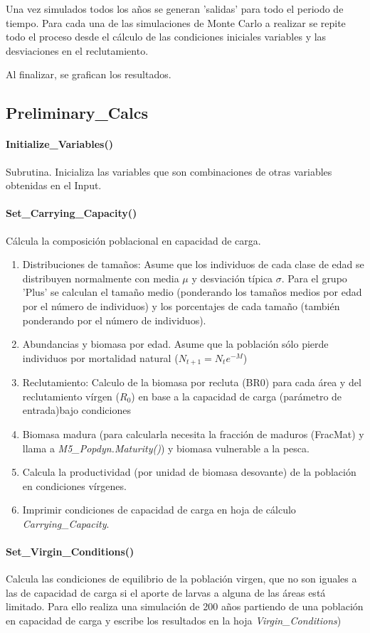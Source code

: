 \documentclass[12pt, oneside, a4paper]{article}
\begin{document}
		Una vez simulados todos los años se generan 'salidas' para todo el periodo de tiempo.
		Para cada una de las simulaciones de Monte Carlo a realizar se repite todo el proceso desde el cálculo de las condiciones iniciales variables y las desviaciones en el reclutamiento. 

		Al finalizar, se grafican los resultados.
		
		\subsection{Preliminary\_Calcs}
			\paragraph{Initialize\_Variables()}
				Subrutina. Inicializa las variables que son combinaciones de otras variables obtenidas en el Input. 
			\paragraph{Set\_Carrying\_Capacity()}
				Cálcula la composición poblacional en capacidad de carga. 
					\begin{enumerate}
						\item Distribuciones de tamaños: Asume que los individuos de cada clase de edad se distribuyen normalmente con media $\mu$ y desviación típica $\sigma$. Para el grupo 'Plus' se calculan el tamaño medio (ponderando los tamaños medios por edad por el número de individuos) y los porcentajes de cada tamaño (también ponderando por el número de individuos). 
						\item Abundancias y biomasa por edad. Asume que la población sólo pierde individuos por mortalidad natural ($N_{t+1}=N_t e^{-M}$)
						\item Reclutamiento: Calculo de la biomasa por recluta (BR0) para cada área y del reclutamiento vírgen ($R_0$) en base a la capacidad de carga (parámetro de entrada)bajo condiciones  
						\item Biomasa madura (para calcularla necesita la fracción de maduros (FracMat) y llama a \emph{M5\_Popdyn.Maturity()}) y biomasa vulnerable a la pesca. 
						\item Calcula la productividad (por unidad de biomasa desovante) de la población en condiciones vírgenes. 
						\item Imprimir condiciones de capacidad de carga en hoja de cálculo \emph{Carrying\_Capacity}. 
					\end{enumerate}
			\paragraph{Set\_Virgin\_Conditions()}
			Calcula las condiciones de equilibrio de la población virgen, que no son iguales a las de capacidad de carga si el aporte de larvas a alguna de las áreas está limitado. 
			Para ello realiza una simulación de 200 años partiendo de una población en capacidad de carga y escribe los resultados en la hoja \emph{Virgin\_Conditions})
\end{document}
